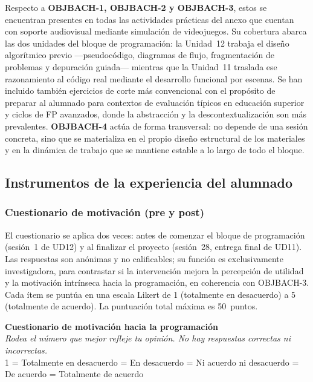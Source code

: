 \documentclass[a4paper,12pt]{article}
\begin{document}
Respecto a \textbf{OBJBACH-1, OBJBACH-2 y OBJBACH-3}, estos se encuentran presentes en todas las actividades prácticas del anexo que cuentan con soporte audiovisual mediante simulación de videojuegos. Su cobertura abarca las dos unidades del bloque de programación: la Unidad~12 trabaja el diseño algorítmico previo ---pseudocódigo, diagramas de flujo, fragmentación de problemas y depuración guiada--- mientras que la Unidad~11 traslada ese razonamiento al código real mediante el desarrollo funcional por escenas. Se han incluido también ejercicios de corte más convencional con el propósito de preparar al alumnado para contextos de evaluación típicos en educación superior y ciclos de FP avanzados, donde la abstracción y la descontextualización son más prevalentes. \textbf{OBJBACH-4} actúa de forma transversal: no depende de una sesión concreta, sino que se materializa en el propio diseño estructural de los materiales y en la dinámica de trabajo que se mantiene estable a lo largo de todo el bloque.

\subsection{Instrumentos de la experiencia del alumnado}

\subsubsection{Cuestionario de motivación (pre y post)}

El cuestionario se aplica dos veces: antes de comenzar el bloque de programación (sesión~1 de UD12) y al finalizar el proyecto (sesión~28, entrega final de UD11). Las respuestas son anónimas y no calificables; su función es exclusivamente investigadora, para contrastar si la intervención mejora la percepción de utilidad y la motivación intrínseca hacia la programación, en coherencia con OBJBACH-3. Cada ítem se puntúa en una escala Likert de 1 (totalmente en desacuerdo) a 5 (totalmente de acuerdo). La puntuación total máxima es 50~puntos.

\vspace{0.3cm}
\noindent\textbf{Cuestionario de motivación hacia la programación}\\[2pt]
\noindent\small\textit{Rodea el número que mejor refleje tu opinión. No hay respuestas correctas ni incorrectas.}\\[2pt]
\noindent\small 1 = Totalmente en desacuerdo  = En desacuerdo  = Ni acuerdo ni desacuerdo  = De acuerdo  = Totalmente de acuerdo
\normalsize
\end{document}
